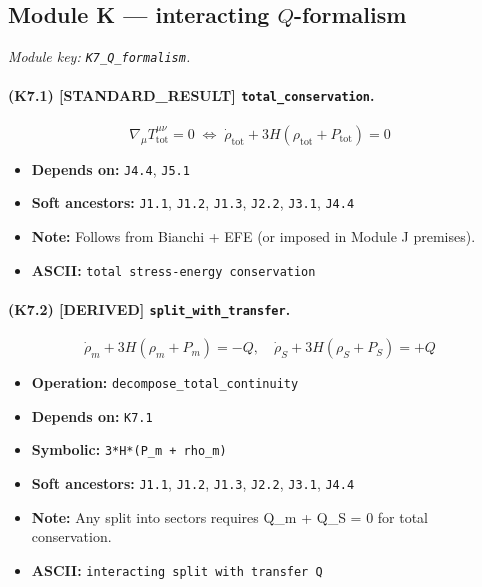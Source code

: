 \documentclass[11pt,a4paper]{article}
\theoremstyle{remark}\newtheorem*{caution}{Caution}
\newcommand{\tagbox}[1]{\textsc{[#1]}}
\begin{document}
\subsection{Module K --- interacting $Q$-formalism}
\textit{Module key: \texttt{K7\_Q\_formalism}.}
\paragraph{(K7.1) \tagbox{STANDARD\_RESULT} \texttt{total\_conservation}.}
\begin{equation}
\nabla_\mu T^{\mu\nu}_{\mathrm{tot}}=0\;\Leftrightarrow\;\dot\rho_{\mathrm{tot}}+3H(\rho_{\mathrm{tot}}+P_{\mathrm{tot}})=0
\tag{K7.1}
\end{equation}
\begin{itemize}\setlength{\itemsep}{0.12em}
\item \textbf{Depends on:} \texttt{J4.4}, \texttt{J5.1}
\item \textbf{Soft ancestors:} \texttt{J1.1}, \texttt{J1.2}, \texttt{J1.3}, \texttt{J2.2}, \texttt{J3.1}, \texttt{J4.4}
\item \textbf{Note:} Follows from Bianchi + EFE (or imposed in Module J premises).
\item \textbf{ASCII:} \texttt{total stress-energy conservation}
\end{itemize}
\paragraph{(K7.2) \tagbox{DERIVED} \texttt{split\_with\_transfer}.}
\begin{equation}
\dot\rho_m+3H(\rho_m+P_m)=-Q,\quad\dot\rho_S+3H(\rho_S+P_S)=+Q
\tag{K7.2}
\end{equation}
\begin{itemize}\setlength{\itemsep}{0.12em}
\item \textbf{Operation:} \texttt{decompose\_total\_continuity}
\item \textbf{Depends on:} \texttt{K7.1}
\item \textbf{Symbolic:} \texttt{3*H*(P\_m + rho\_m)}
\item \textbf{Soft ancestors:} \texttt{J1.1}, \texttt{J1.2}, \texttt{J1.3}, \texttt{J2.2}, \texttt{J3.1}, \texttt{J4.4}
\item \textbf{Note:} Any split into sectors requires Q\_m + Q\_S = 0 for total conservation.
\item \textbf{ASCII:} \texttt{interacting split with transfer Q}
\end{itemize}
\end{document}
